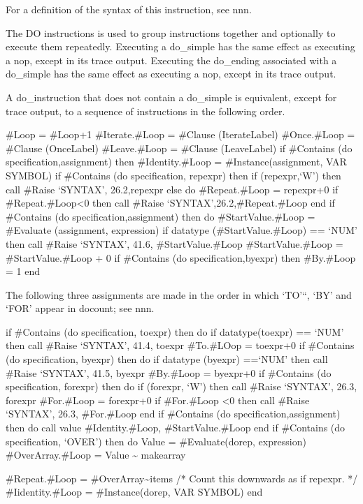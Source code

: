 For a definition of the syntax of this instruction, see nnn.

The DO instructions is used to group instructions together and
optionally to execute them repeatedly. Executing a do\_simple has the
same effect as executing a nop, except in its trace output. Executing
the do\_ending associated with a do\_simple has the same effect as
executing a nop, except in its trace output.

A do\_instruction that does not contain a do\_simple is equivalent,
except for trace output, to a sequence of instructions in the following
order.

\#Loop = \#Loop+1 \#Iterate.\#Loop = \#Clause (IterateLabel)
\#Once.\#Loop = \#Clause (OnceLabel) \#Leave.\#Loop = \#Clause
(LeaveLabel) if \#Contains (do specification,assignment) then
\#Identity.\#Loop = \#Instance(assignment, VAR SYMBOL) if \#Contains (do
specification, repexpr) then if \datatype(repexpr,`W') then call \#Raise
`SYNTAX', 26.2,repexpr else do \#Repeat.\#Loop = repexpr+0 if
\#Repeat.\#Loop\textless0 then call \#Raise
`SYNTAX',26.2,\#Repeat.\#Loop end if \#Contains (do
specification,assignment) then do \#StartValue.\#Loop = \#Evaluate
(assignment, expression) if datatype (\#StartValue.\#Loop) == `NUM' then
call \#Raise `SYNTAX', 41.6, \#StartValue.\#Loop \#StartValue.\#Loop =
\#StartValue.\#Loop + 0 if \#Contains (do specification,byexpr) then
\#By.\#Loop = 1 end

The following three assignments are made in the order in which `TO'``,
`BY' and `FOR' appear in docount; see nnn.

if \#Contains (do specification, toexpr) then do if datatype(toexpr) ==
`NUM' then call \#Raise `SYNTAX', 41.4, toexpr \#To.\#LOop = toexpr+0 if
\#Contains (do specification, byexpr) then do if datatype (byexpr)
==`NUM' then call \#Raise `SYNTAX', 41.5, byexpr \#By.\#Loop = byexpr+0
if \#Contains (do specification, forexpr) then do if \datatype(forexpr,
`W') then call \#Raise `SYNTAX', 26.3, forexpr \#For.\#Loop = forexpr+0
if \#For.\#Loop \textless0 then call \#Raise `SYNTAX', 26.3,
\#For.\#Loop end if \#Contains (do specification,assignment) then do
call value \#Identity.\#Loop, \#StartValue.\#Loop end if \#Contains (do
specification, `OVER') then do Value = \#Evaluate(dorep, expression)
\#OverArray.\#Loop = Value \textasciitilde{} makearray

\#Repeat.\#Loop = \#OverArray\textasciitilde items /* Count this
downwards as if repexpr. */ \#Iidentity.\#Loop = \#Instance(dorep, VAR
SYMBOL) end

